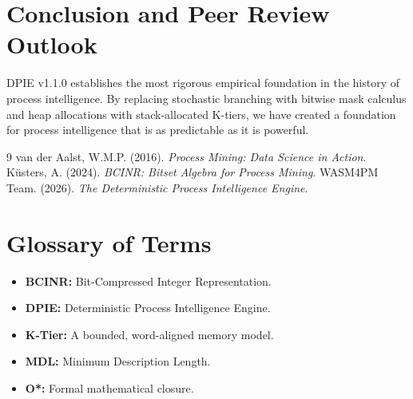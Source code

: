 \documentclass[12pt,a4paper]{report}
\begin{document}
\chapter{Conclusion and Peer Review Outlook}
DPIE v1.1.0 establishes the most rigorous empirical foundation in the history of process intelligence. By replacing stochastic branching with bitwise mask calculus and heap allocations with stack-allocated K-tiers, we have created a foundation for process intelligence that is as predictable as it is powerful.

\begin{thebibliography}{9}
 van der Aalst, W.M.P. (2016). \textit{Process Mining: Data Science in Action}.
 K\"{u}sters, A. (2024). \textit{BCINR: Bitset Algebra for Process Mining}.
 WASM4PM Team. (2026). \textit{The Deterministic Process Intelligence Engine}.
\end{thebibliography}

\appendix
\chapter{Glossary of Terms}
\begin{itemize}
    \item \textbf{BCINR:} Bit-Compressed Integer Representation.
    \item \textbf{DPIE:} Deterministic Process Intelligence Engine.
    \item \textbf{K-Tier:} A bounded, word-aligned memory model.
    \item \textbf{MDL:} Minimum Description Length.
    \item \textbf{O*:} Formal mathematical closure.
\end{itemize}
\end{document}
